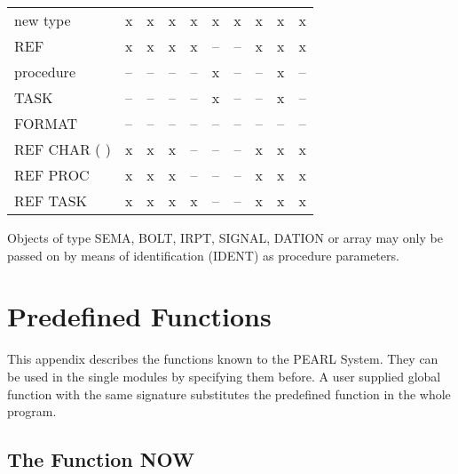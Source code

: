 \begin{table}[htb]
\begin{tabular}{lccccccccc}
new type       & x     &  x      & x     &  x     &  x    &   x    &  x  &    x   &  x   \\
REF            & x     &  x      & x     &  x     &  --   &   --   &  x  &    x   &  x   \\
procedure      & --    &  --     & --    &  --    &  x    &   --   &  -- &    x   &  --  \\
TASK           & --    &  --     & --    &  --    &  x    &   --   &  -- &    x   &  --  \\
FORMAT         & --    &  --     & --    &  --    &  --   &   --   &  -- &    --  &  --  \\
REF CHAR ( )   & x     &  x      & x     &  --    &  --   &   --   &  x  &    x   &  x   \\
REF PROC       & x     &  x      & x     &  --    &  --   &   --   &  x  &    x   &  x   \\
REF TASK       & x     &  x      & x     &  x     &  --   &   --   &  x  &    x   &  x   \\
\end{tabular}
\end{table}
                                                                                 
Objects of type SEMA, BOLT, IRPT, SIGNAL, DATION or array may only be 
passed on by means of identification (IDENT) as procedure parameters.

\newpage
\section{Predefined Functions}   %

This appendix describes the functions known to the PEARL
System. They
can be used in the single modules 
by
 specifying them before. 
A user supplied global function with the same signature substitutes
the predefined function in the whole program.

\subsection{The Function NOW}    %
\label{sec_function_now}

